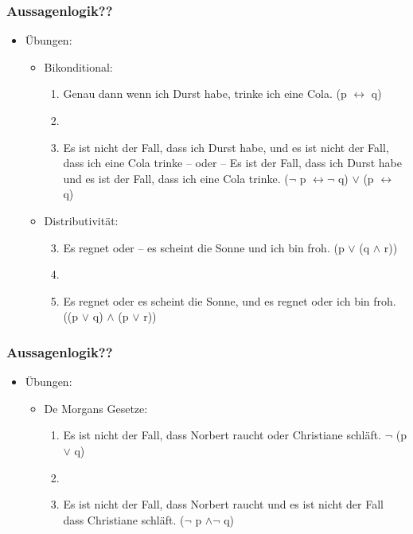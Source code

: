 \begin{frame}
\frametitle{Aussagenlogik??}

\begin{itemize}
\item Übungen: 

\vspace{1em}

\begin{itemize}
\item Bikonditional:

\begin{enumerate}
\item Genau dann wenn ich Durst habe, trinke ich eine Cola. (p $\leftrightarrow$ q)
\item[]
\item Es ist nicht der Fall, dass ich Durst habe, und es ist nicht der Fall, dass ich eine Cola trinke – oder – Es ist der Fall, dass ich Durst habe und es ist der Fall, dass ich eine Cola trinke. ($\lnot$ p $\leftrightarrow \lnot$ q) $\lor$ (p $\leftrightarrow$ q)
\end{enumerate}

\item Distributivität:

\begin{enumerate}\setcounter{enumi}{2}
\item Es regnet oder -- es scheint die Sonne und ich bin froh. (p  $\lor$ (q $\land$ r))
\item[]
\item Es regnet oder es scheint die Sonne, und es regnet oder ich bin froh. ((p $\lor$ q) $\land$ (p $\lor$ r))
\end{enumerate}

\end{itemize}

\end{itemize}
\end{frame}



\begin{frame}
\frametitle{Aussagenlogik??}

\begin{itemize}
\item Übungen:

\begin{itemize}
\item De Morgans Gesetze:

\begin{enumerate}
\item Es ist nicht der Fall, dass Norbert raucht oder Christiane schläft. $\lnot$ (p $\lor$ q)
\item[]
\item Es ist nicht der Fall, dass Norbert raucht und es ist nicht der Fall dass Christiane schläft. ($\lnot$ p $\land \lnot$ q)
\end{enumerate}

\end{itemize}

\end{itemize}


\end{frame}



